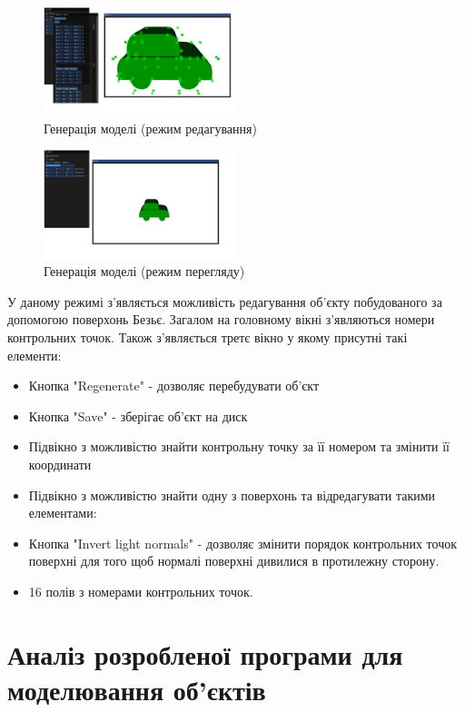 \let\mypdfximage\pdfximage\def\pdfximage{\immediate\mypdfximage}\documentclass[14pt,a4paper]{extarticle}
\theoremstyle{definition}
\renewcommand{\[}{\begin{singlespace}\begin{equation*}}
\renewcommand{\]}{\end{equation*}\end{singlespace}}
\renewcommand{\+}{\discretionary{\mbox{\scriptsize$\hookleftarrow$}}{}{}}
\begin{document}
\begin{figure}[!htb]
    \centering
    \includegraphics[width=0.5\textwidth]{edit-car.png}
    \caption{Генерація моделі (режим редагування)}\label{fig:edit-car}
\end{figure}

\begin{figure}[!htb]
    \centering
    \includegraphics[width=0.5\textwidth]{car-view.png}
    \caption{Генерація моделі (режим перегляду)}\label{fig:car-view}
\end{figure}

У даному режимі з'являється можливість редагування об'єкту побудованого за допомогою поверхонь Безьє. Загалом на головному вікні з'являються номери контрольних точок. Також з'являється третє вікно у якому присутні такі елементи:

\begin{itemize}
\item Кнопка "Regenerate" - дозволяє перебудувати об'єкт
\item Кнопка "Save" - зберігає об'єкт на диск
\item Підвікно з можливістю знайти контрольну точку за її номером та змінити її координати
\item Підвікно з можливістю знайти одну з поверхонь та відредагувати такими елементами:
\item Кнопка "Invert light normals" - дозволяє змінити порядок контрольних точок поверхні для того щоб нормалі поверхні дивилися в протилежну сторону.
\item 16 полів з номерами контрольних точок.
\end{itemize}

\section{Аналіз розробленої програми для моделювання об'єктів}
\end{document}
